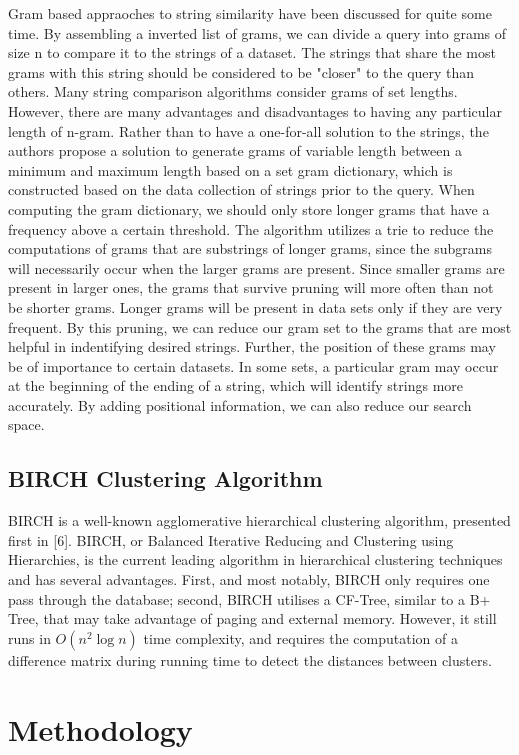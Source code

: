 \documentclass[pdftex,12pt,letter]{article}
\begin{document}
Gram based appraoches to string similarity have been discussed for quite some time. By assembling a inverted list of grams, we can divide a query into grams of size n to compare it to the strings of a dataset. The strings that share the most grams with this string should be considered to be "closer" to the query than others. Many string comparison algorithms consider grams of set lengths. However, there are many advantages and disadvantages to having any particular length of n-gram. Rather than to have a one-for-all solution to the strings, the authors propose a solution to generate grams of variable length between a minimum and maximum length based on a set gram dictionary, which is constructed based on the data collection of strings prior to the query. When computing the gram dictionary, we should only store longer grams that have a frequency above a certain threshold. The algorithm utilizes a trie to reduce the computations of grams that are substrings of longer grams, since the subgrams will necessarily occur when the larger grams are present. Since smaller grams are present in larger ones, the grams that survive pruning will more often than not be shorter grams. Longer grams will be present in data sets only if they are very frequent. By this pruning, we can reduce our gram set to the grams that are most helpful in indentifying desired strings. Further, the position of these grams may be of importance to certain datasets. In some sets, a particular gram may occur at the beginning of the ending of a string, which will identify strings more accurately. By adding positional information, we can also reduce our search space. 

\subsection{BIRCH Clustering Algorithm}
BIRCH is a well-known agglomerative hierarchical clustering algorithm, presented first in [6]. BIRCH, or Balanced Iterative Reducing and Clustering using Hierarchies, is the current leading algorithm in hierarchical clustering techniques and has several advantages. First, and most notably, BIRCH only requires one pass through the database; second, BIRCH utilises a CF-Tree, similar to a B+ Tree, that may take advantage of paging and external memory. However, it still runs in $O(n^2\log{n})$ time complexity, and requires the computation of a difference matrix during running time to detect the distances between clusters.

\section{Methodology}
\end{document}
